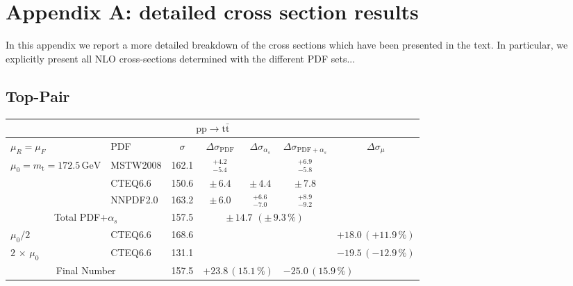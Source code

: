 \section*{Appendix A: detailed cross section results}

In this appendix we report a more detailed breakdown of the cross sections  
which have been presented in the text. In particular, we explicitly present
all NLO cross-sections determined with the different PDF sets...

\subsection*{Top-Pair}

\begin{table}[htb]
  \begin{center}
    \begin{tabular}{|l|l|c|c|c|c|c|}
      \hline

      \multicolumn{7}{|c|}{$\mathrm{pp}\to\mathrm{t}\bar{\mathrm{t}}$} \\ \hline
      $\mu_R=\mu_F$ & PDF & $\sigma$ & $\Delta\sigma_{\mathrm{PDF}}$ & $\Delta\sigma_{\alpha_s}$ & $\Delta\sigma_{\mathrm{PDF}+\alpha_s}$ & $\Delta\sigma_{\mu}$ \\ \hline\hline

      $\mu_0=m_\mathrm{t}=172.5\,\mathrm{GeV}$ & MSTW2008 & 162.1 & $^{+4.2}_{-5.4}$ &     &  $^{+6.9}_{-5.8}$    &     \\
                                                & CTEQ6.6  & 150.6 & $\pm\,6.4$ &  $\pm\,4.4$  &  $\pm\,7.8$       &     \\
                                                & NNPDF2.0 & 163.2 & $\pm\,6.0$ &  $^{+6.6}_{-7.0}$  &  $^{+8.9}_{-9.2}$       &     \\ \hline\hline
      \multicolumn{2}{|c|}{Total PDF+$\alpha_s$}      &  157.5    & \multicolumn{3}{c|}{$\pm\,14.7\,\,(\pm\,9.3\,\%)$} & \\ \hline\hline
      $\mu_0/2$                                 & CTEQ6.6 & 168.6 & \multicolumn{3}{c|}{} & $+18.0\,(+11.9\,\%)$ \\ 
      $2\,\times\,\mu_0$                        & CTEQ6.6 & 131.1 & \multicolumn{3}{c|}{} & $-19.5\,(-12.9\,\%)$ \\  \hline\hline
      \multicolumn{2}{|c|}{Final Number} & 157.5 & \multicolumn{2}{l}{$+23.8\,(15.1\,\%)$} & \multicolumn{2}{l|}{$-25.0\,(15.9\,\%)$} \\

\hline 
\end{tabular}
\end{center}
\end{table} 

